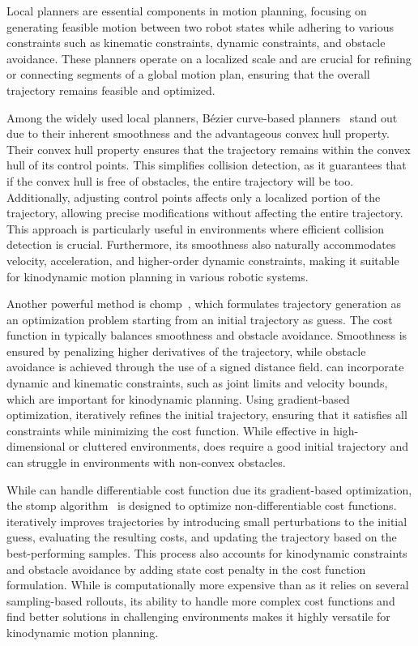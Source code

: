 Local planners are essential components in motion planning, focusing on generating feasible motion between two robot states while adhering to various constraints such as kinematic constraints, dynamic constraints, and obstacle avoidance. 
These planners operate on a localized scale and are crucial for refining or connecting segments of a global motion plan, ensuring that the overall trajectory remains feasible and optimized.

Among the widely used local planners, Bézier curve-based planners~\cite{cBezier,cBezier2} stand out due to their inherent smoothness and the advantageous convex hull property.
Their convex hull property ensures that the trajectory remains within the convex hull of its control points. 
This simplifies collision detection, as it guarantees that if the convex hull is free of obstacles, the entire trajectory will be too. 
Additionally, adjusting control points affects only a localized portion of the trajectory, allowing precise modifications without affecting the entire trajectory. 
This approach is particularly useful in environments where efficient collision detection is crucial.
Furthermore, its smoothness also naturally accommodates velocity, acceleration, and higher-order dynamic constraints, making it suitable for kinodynamic motion planning in various robotic systems. 

Another powerful method is \gls{chomp}~\cite{cCHOMP}, which formulates trajectory generation as an optimization problem starting from an initial trajectory as guess. 
The cost function in  typically balances smoothness and obstacle avoidance.
Smoothness is ensured by penalizing higher derivatives of the trajectory, while obstacle avoidance is achieved through the use of a signed distance field. 
 can incorporate dynamic and kinematic constraints, such as joint limits and velocity bounds, which are important for kinodynamic planning. 
Using gradient-based optimization,  iteratively refines the initial trajectory, ensuring that it satisfies all constraints while minimizing the cost function. 
While effective in high-dimensional or cluttered environments,  does require a good initial trajectory and can struggle in environments with non-convex obstacles.

While  can handle differentiable cost function due its gradient-based optimization, the \gls{stomp} algorithm~\cite{cSTOMP} is designed to optimize non-differentiable cost functions. 
 iteratively improves trajectories by introducing small perturbations to the initial guess, evaluating the resulting costs, and updating the trajectory based on the best-performing samples. 
This process also accounts for kinodynamic constraints and obstacle avoidance by adding state cost penalty in the cost function formulation.
While  is computationally more expensive than  as it relies on several sampling-based rollouts, its ability to handle more complex cost functions and find better solutions in challenging environments makes it highly versatile for kinodynamic motion planning.

